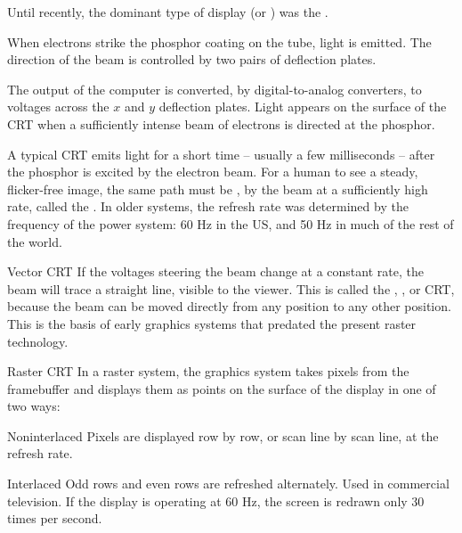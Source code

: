 \documentclass[\main/notes.tex]{subfiles}
\begin{document}
				Until recently, the dominant type of display (or ) was the
				.

				When electrons strike the phosphor coating on the tube, light is emitted.
				The direction of the beam is controlled by two pairs of deflection plates.

				The output of the computer is converted, by digital-to-analog converters,
				to voltages across the $x$ and $y$ deflection plates.
				Light appears on the surface of the CRT when a sufficiently intense beam of electrons
				is directed at the phosphor.

				A typical CRT emits light for a short time -- usually a few milliseconds
				-- after the phosphor is excited by the electron beam.
				For a human to see a steady, flicker-free image, the same path must be ,
				by the beam at a sufficiently high rate, called the .
				In older systems, the refresh rate was determined by the frequency of the power system:
				60 Hz in the US, and 50 Hz in much of the rest of the world.

				\begin{definition}{Vector CRT}
					If the voltages steering the beam change at a constant rate,
					the beam will trace a straight line, visible to the viewer.
					This is called the \mbox{}, ,
					or  CRT,
					because the beam can be moved directly from any position to any other position.
					This is the basis of early graphics systems that predated the present raster technology.
				\end{definition}

				\begin{definition}{Raster CRT}
					In a raster system, the graphics system takes pixels from the framebuffer and
					displays them as points on the surface of the display in one of two ways:
					\begin{descriptimize}[nosep]
						\item[Noninterlaced] Pixels are displayed row by row,
						or scan line by scan line, at the refresh rate.
						\item[Interlaced] Odd rows and even rows are refreshed alternately.
						Used in commercial television.
						If the display is operating at 60 Hz, the screen is redrawn only 30 times per second.
					\end{descriptimize}
				\end{definition}
\end{document}
